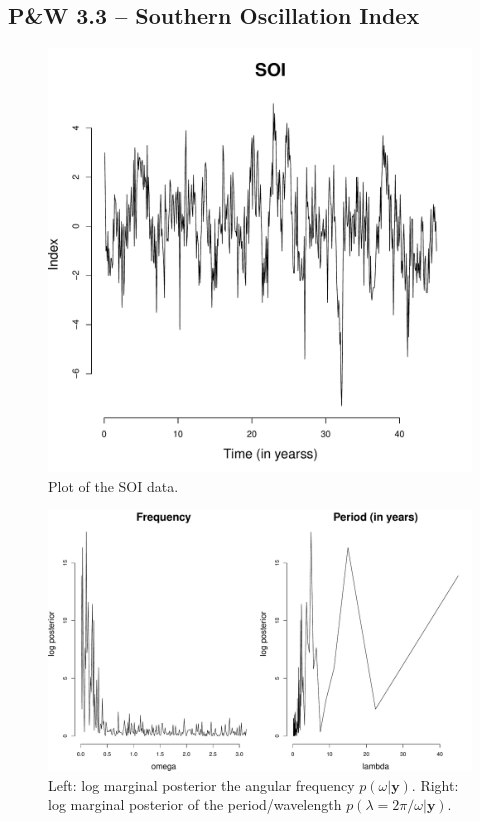 \documentclass[12pt]{article}
\newcommand{\m}[1]{\mathbf{\bm{#1}}}
\begin{document}
\subsection*{P\&W 3.3 -- Southern Oscillation Index}

\begin{figure}[H]
\begin{center}
\includegraphics[scale=0.40]{dat_soi.pdf}
\end{center}
\caption{Plot of the SOI data.}
\end{figure}

\begin{figure}[H]
\begin{center}
\includegraphics[scale=0.34]{fp_soi.pdf}
\end{center}
\caption{Left: log marginal posterior the angular frequency $p(\omega|\m{y})$. Right: log marginal posterior of the period/wavelength $p(\lambda=2\pi/\omega|\m{y})$.}
\end{figure}
\end{document}
